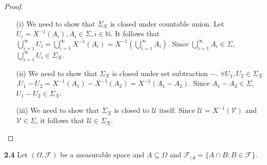 \begin{proof}
    \begin{enumerate}
        \item[(i)] We need to show that $\Sigma_X$ is closed under countable union. Let $U_i=X^{-1}(A_i),A_i\in \Sigma, i\in \mathbb{N}$. It follows that $\bigcup\limits^{\infty}_{i=1}U_i=\bigcup\limits^{\infty}_{i=1}X^{-1}(A_i)=X^{-1}(\bigcup\limits^{\infty}_{i=1}A_i)$. Since $\bigcup\limits^{\infty}_{i=1}A_i\in \Sigma$, $\bigcup\limits^{\infty}_{i=1}U_i\in \Sigma_X$.
        \item[(ii)] We need to show that $\Sigma_X$ is closed under set subtraction $-$. $\forall U_1,U_2\in \Sigma_X$,$U_1-U_2=X^{-1}(A_1)-X^{-1}(A_2)=X^{-1}(A_1-A_2)$. Since $A_1-A_2\in \Sigma$, $U_1-U_2\in \Sigma_X$.
        \item[(iii)] We need to show that $\Sigma_X$ is closed to $\mathcal{U}$ itself. Since $\mathcal{U}=X^{-1}(\mathcal{V})$ and $\mathcal{V}\in \Sigma$, it follows that $\mathcal{U}\in \Sigma_X$.
        \end{enumerate}
\end{proof}



\noindent\textbf{2.4}
Let $(\Omega,\mathcal{F})$ be a measurable space and $A \subseteq \Omega$ and $\mathcal{F}_{|A} = \{A \cap B: B \in \mathcal{F}\}$.

